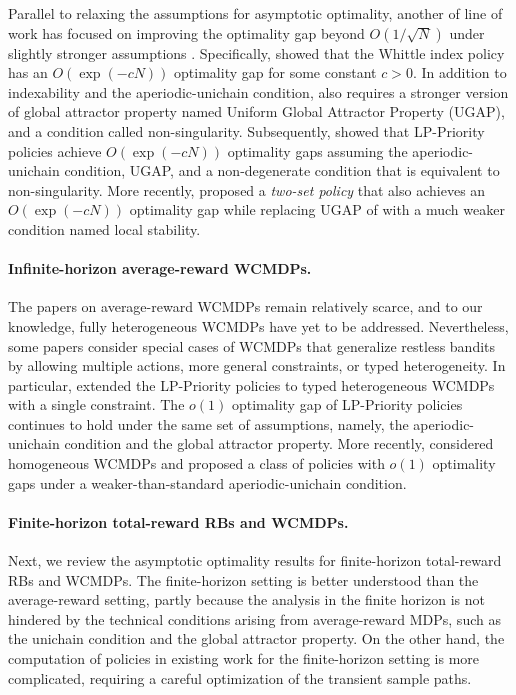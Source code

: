 Parallel to relaxing the assumptions for asymptotic optimality, another of line of work has focused on improving the optimality gap beyond $O(1/\sqrt{N})$ under slightly stronger assumptions \citep{GasGauYan_23_exponential,GasGauYan_23_whittles,hong2024exponential}. 
Specifically, \citet{GasGauYan_23_whittles} showed that the Whittle index policy has an $O(\exp(-cN))$ optimality gap for some constant $c>0$. In addition to indexability and the aperiodic-unichain condition, \citep{GasGauYan_23_whittles} also requires a stronger version of global attractor property named Uniform Global Attractor Property (UGAP), and a condition called non-singularity. 
Subsequently, \citet{GasGauYan_23_exponential} showed that LP-Priority policies achieve $O(\exp(-cN))$ optimality gaps assuming the aperiodic-unichain condition, UGAP, and a non-degenerate condition that is equivalent to non-singularity. 
More recently, \citet{hong2024exponential} proposed a \emph{two-set policy} that also achieves an $O(\exp(-cN))$ optimality gap while replacing UGAP of \citep{GasGauYan_23_exponential} with a much weaker condition named local stability. 


\paragraph{Infinite-horizon average-reward WCMDPs.}
The papers on average-reward WCMDPs remain relatively scarce, and to our knowledge, fully heterogeneous WCMDPs have yet to be addressed. Nevertheless, some papers consider special cases of WCMDPs that generalize restless bandits by allowing multiple actions, more general constraints, or typed heterogeneity. 
In particular, \citep{Ver_16_verloop} extended the LP-Priority policies to typed heterogeneous WCMDPs with a single constraint. The $o(1)$ optimality gap of LP-Priority policies continues to hold under the same set of assumptions, namely, the aperiodic-unichain condition and the global attractor property. 
More recently, \citep{GolAvr_24_wcmdp_multichain} considered homogeneous WCMDPs and proposed a class of policies with $o(1)$ optimality gaps under a weaker-than-standard aperiodic-unichain condition. 


\paragraph{Finite-horizon total-reward RBs and WCMDPs.}
Next, we review the asymptotic optimality results for finite-horizon total-reward RBs and WCMDPs. The finite-horizon setting is better understood than the average-reward setting, partly because the analysis in the finite horizon is not hindered by the technical conditions arising from average-reward MDPs, such as the unichain condition and the global attractor property. On the other hand, the computation of policies in existing work for the finite-horizon setting is more complicated, requiring a careful optimization of the transient sample paths. 


